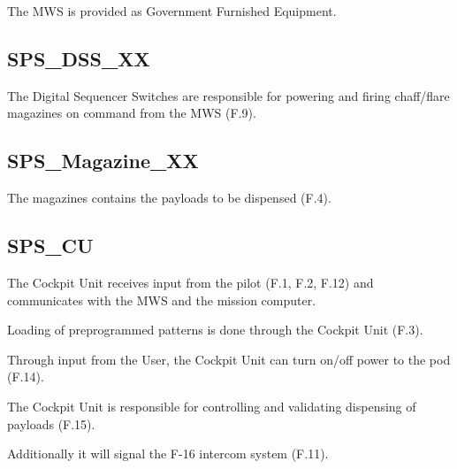 \documentclass[Main]{subfiles}
\begin{document}
The MWS is provided as Government Furnished Equipment.

\subsection{SPS\_DSS\_XX}
The Digital Sequencer Switches are responsible for powering and firing chaff/flare magazines on command from the MWS (F.9).

\subsection{SPS\_Magazine\_XX}
The magazines contains the payloads to be dispensed (F.4).

\subsection{SPS\_CU}
The Cockpit Unit receives input from the pilot (F.1, F.2, F.12) and communicates with the MWS and the mission computer.

Loading of preprogrammed patterns is done through the Cockpit Unit (F.3).

Through input from the User, the Cockpit Unit can turn on/off power to the pod (F.14).

The Cockpit Unit is responsible for controlling and validating dispensing of payloads (F.15).

Additionally it will signal the F-16 intercom system (F.11).
\end{document}
